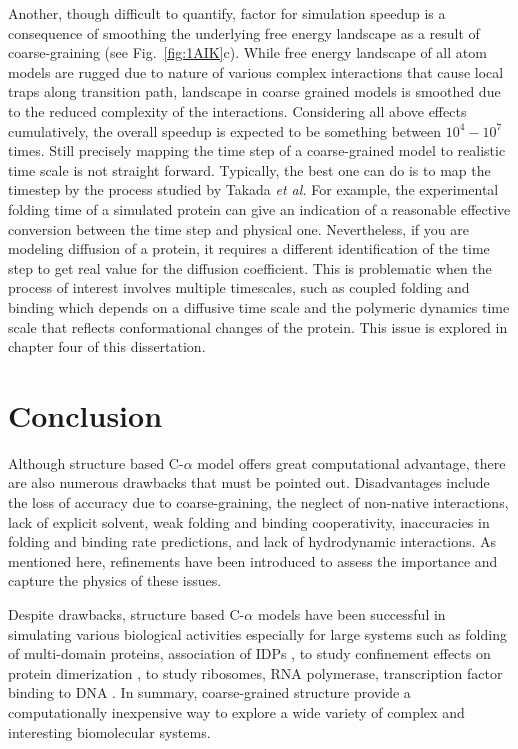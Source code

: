 \documentclass[../talant.diss.submit.tex]{subfiles}
\begin{document}
Another, though difficult to quantify, factor for simulation speedup is a
consequence of smoothing the underlying free energy landscape as a result of
coarse-graining (see Fig.~\ref{fig:1AIK}c). While free energy landscape of all
atom models are rugged due to nature of various complex interactions that cause
local traps along transition path,  landscape in coarse grained models is
smoothed due to the reduced complexity of the interactions. Considering all
above effects cumulatively, the overall speedup is expected to be something
between $10^4 - 10^7$ times.\cite{takada:12}  Still precisely
mapping the time step of a coarse-grained model to realistic time scale is not
straight forward. Typically, the best one can do is to map the timestep by the
process studied by Takada \textit{et al.} For example, the experimental folding
time of a simulated protein can give an indication of a reasonable effective
conversion between the time step and physical one.
Nevertheless, if you are modeling diffusion of a protein, it requires a
different identification of the time step to get real value for the diffusion
coefficient.  This is problematic when the process of interest involves multiple
timescales, such as coupled folding and binding which depends on a diffusive
time scale and the polymeric dynamics time scale that reflects conformational
changes of the protein. This issue is explored in chapter four of this
dissertation.


%
%
\section{\textbf{Conclusion}}\label{sect:two_eleven}
%
%
Although structure based C-$\alpha$ model offers great computational advantage, there are also numerous
drawbacks that must be pointed out. Disadvantages include the loss of accuracy due to coarse-graining,
the neglect of non-native interactions, lack of explicit solvent, weak folding
and binding cooperativity, inaccuracies in folding and binding rate predictions, and lack of
hydrodynamic interactions. As mentioned here, refinements have been introduced to assess the importance
and capture the physics of these issues. 

Despite drawbacks, structure based C-$\alpha$ models have been successful in
simulating various biological activities especially for large systems such as folding of
multi-domain proteins\cite{borgia:11s,sulkowska:09d}, association of IDPs
\cite{huang:10,ganguly:11, de-sancho:12, cao:16, umezawa:16}, to study
confinement effects on protein dimerization
\cite{levy:05,wang:09c}, to study ribosomes, RNA polymerase,
transcription factor binding to DNA \cite{chen:10p,khazanov:11s,vuzman:10d}. 
In summary, coarse-grained structure
provide a computationally inexpensive way to explore a wide variety of 
complex and interesting biomolecular systems.
\end{document}
